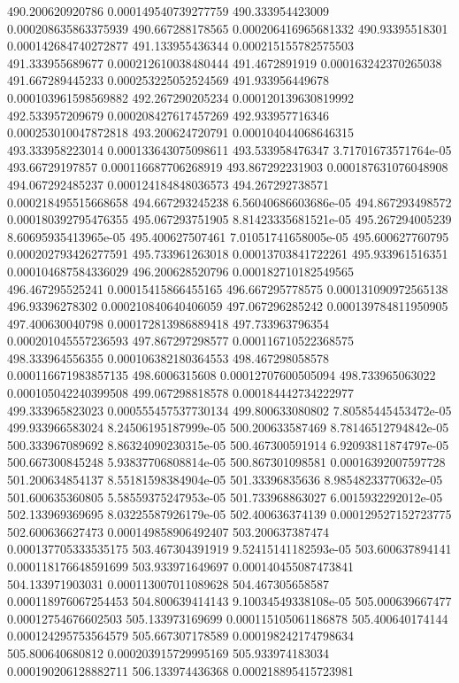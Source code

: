 {490.200620920786 0.000149540739277759
490.333954423009 0.000208635863375939
490.667288178565 0.000206416965681332
490.93395518301 0.000142684740272877
491.133955436344 0.000215155782575503
491.333955689677 0.000212610038480444
491.4672891919 0.000163242370265038
491.667289445233 0.000253225052524569
491.933956449678 0.000103961598569882
492.267290205234 0.000120139630819992
492.533957209679 0.000208427617457269
492.933957716346 0.000253010047872818
493.200624720791 0.000104044068646315
493.333958223014 0.000133643075098611
493.533958476347 3.71701673571764e-05
493.66729197857 0.000116687706268919
493.867292231903 0.000187631076048908
494.067292485237 0.000124184848036573
494.267292738571 0.000218495515668658
494.667293245238 6.56040686603686e-05
494.867293498572 0.000180392795476355
495.067293751905 8.81423335681521e-05
495.267294005239 8.60695935413965e-05
495.400627507461 7.01051741658005e-05
495.600627760795 0.000202793426277591
495.733961263018 0.00013703841722261
495.933961516351 0.000104687584336029
496.200628520796 0.000182710182549565
496.467295525241 0.00015415866455165
496.667295778575 0.000131090972565138
496.93396278302 0.000210840640406059
497.067296285242 0.000139784811950905
497.400630040798 0.000172813986889418
497.733963796354 0.000201045557236593
497.867297298577 0.000116710522368575
498.333964556355 0.000106382180364553
498.467298058578 0.000116671983857135
498.6006315608 0.00012707600505094
498.733965063022 0.000105042240399508
499.067298818578 0.000184442734222977
499.333965823023 0.000555457537730134
499.800633080802 7.80585445453472e-05
499.933966583024 8.24506195187999e-05
500.200633587469 8.78146512794842e-05
500.333967089692 8.86324090230315e-05
500.467300591914 6.92093811874797e-05
500.667300845248 5.93837706808814e-05
500.867301098581 0.00016392007597728
501.200634854137 8.55181598384904e-05
501.33396835636 8.98548233770632e-05
501.600635360805 5.58559375247953e-05
501.733968863027 6.0015932292012e-05
502.133969369695 8.03225587926179e-05
502.400636374139 0.000129527152723775
502.600636627473 0.000149858906492407
503.200637387474 0.000137705333535175
503.467304391919 9.52415141182593e-05
503.600637894141 0.000118176648591699
503.933971649697 0.000140455087473841
504.133971903031 0.000113007011089628
504.467305658587 0.000118976067254453
504.800639414143 9.10034549338108e-05
505.000639667477 0.00012754676602503
505.133973169699 0.000115105061186878
505.400640174144 0.000124295753564579
505.667307178589 0.000198242174798634
505.800640680812 0.000203915729995169
505.933974183034 0.000190206128882711
506.133974436368 0.000218895415723981
}
